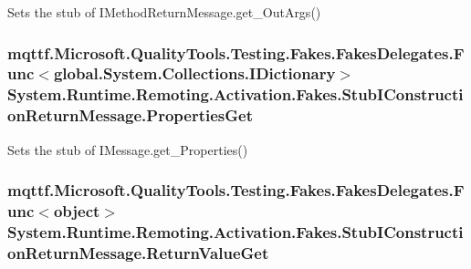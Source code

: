 Sets the stub of I\-Method\-Return\-Message.\-get\-\_\-\-Out\-Args()

\hypertarget{class_system_1_1_runtime_1_1_remoting_1_1_activation_1_1_fakes_1_1_stub_i_construction_return_message_ac5dd7ed84428c72897d8fef3b1531b36}{
\subsubsection[{Properties\-Get}]{\setlength{\rightskip}{0pt plus 5cm}mqttf.\-Microsoft.\-Quality\-Tools.\-Testing.\-Fakes.\-Fakes\-Delegates.\-Func$<$global.\-System.\-Collections.\-I\-Dictionary$>$ System.\-Runtime.\-Remoting.\-Activation.\-Fakes.\-Stub\-I\-Construction\-Return\-Message.\-Properties\-Get}}\label{class_system_1_1_runtime_1_1_remoting_1_1_activation_1_1_fakes_1_1_stub_i_construction_return_message_ac5dd7ed84428c72897d8fef3b1531b36}


Sets the stub of I\-Message.\-get\-\_\-\-Properties()

\hypertarget{class_system_1_1_runtime_1_1_remoting_1_1_activation_1_1_fakes_1_1_stub_i_construction_return_message_a96aaca4134e9ee6b634495c2c1ce2ecb}{
\subsubsection[{Return\-Value\-Get}]{\setlength{\rightskip}{0pt plus 5cm}mqttf.\-Microsoft.\-Quality\-Tools.\-Testing.\-Fakes.\-Fakes\-Delegates.\-Func$<$object$>$ System.\-Runtime.\-Remoting.\-Activation.\-Fakes.\-Stub\-I\-Construction\-Return\-Message.\-Return\-Value\-Get}}\label{class_system_1_1_runtime_1_1_remoting_1_1_activation_1_1_fakes_1_1_stub_i_construction_return_message_a96aaca4134e9ee6b634495c2c1ce2ecb}


